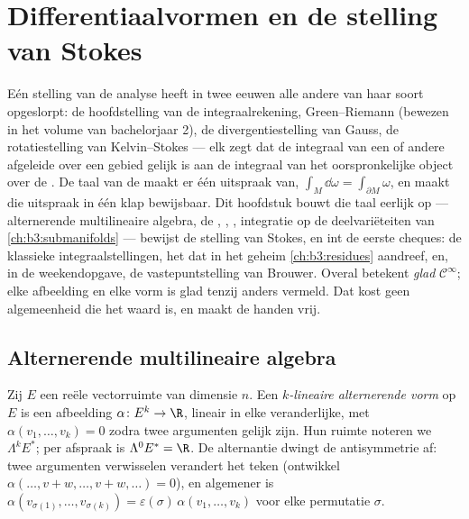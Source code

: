 \chapter{Differentiaalvormen en de stelling van
Stokes}\label{ch:b3:forms}

Eén stelling van de analyse heeft in twee eeuwen alle andere van
haar soort opgeslorpt: de hoofdstelling van de
integraalrekening, Green--Riemann (bewezen in het volume van
bachelorjaar 2), de divergentiestelling van Gauss, de
rotatiestelling van Kelvin--Stokes --- elk zegt dat de integraal
van een of andere afgeleide over een gebied gelijk is aan de
integraal van het oorspronkelijke object over de . De taal
van de \emph{} maakt er één uitspraak van,
$\int_M\dd\omega = \int_{\partial M}\omega$, en maakt die
uitspraak in één klap bewijsbaar. Dit hoofdstuk bouwt die taal
eerlijk op --- alternerende multilineaire algebra, de , , , integratie op de
deelvariëteiten van \cref{ch:b3:submanifolds} --- bewijst de
stelling van Stokes, en int de eerste cheques: de klassieke
integraalstellingen, het  dat in het geheim
\cref{ch:b3:residues} aandreef, en, in de weekendopgave, de
vastepuntstelling van Brouwer. Overal betekent \emph{glad}
$\mathcal C^\infty$; elke afbeelding en elke vorm is glad tenzij
anders vermeld. Dat kost geen algemeenheid die het waard is, en
maakt de handen vrij.

\section{Alternerende multilineaire algebra}

\begin{definition}\label{def:b3:forms:alternating}
Zij $E$ een reële vectorruimte van dimensie $n$. Een
\emph{$k$-lineaire alternerende vorm}
op $E$ is een afbeelding $\alpha\colon E^k \to \R$, lineair in
elke veranderlijke, met $\alpha(v_1, \dots, v_k) = 0$ zodra twee
argumenten gelijk zijn. Hun ruimte noteren we $\Lambda^k E^*$;
per afspraak is $\Lambda^0E^* = \R$. De alternantie dwingt de
antisymmetrie af: twee argumenten verwisselen verandert het teken
(ontwikkel $\alpha(\dots, v + w, \dots, v + w, \dots) = 0$), en
algemener is $\alpha(v_{\sigma(1)}, \dots, v_{\sigma(k)}) =
\varepsilon(\sigma)\,\alpha(v_1, \dots, v_k)$ voor elke
permutatie $\sigma$.
\end{definition}


